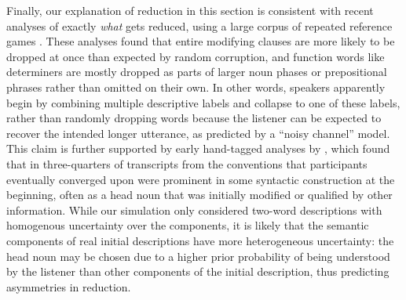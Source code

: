 Finally, our explanation of reduction in this section is consistent with recent analyses of exactly \emph{what} gets reduced, using a large corpus of repeated reference games \cite{hawkins2020characterizing}.
These analyses found that entire modifying clauses are more likely to be dropped at once than expected by random corruption, and function words like determiners are mostly dropped as parts of larger noun phases or prepositional phrases rather than omitted on their own.
In other words, speakers apparently begin by combining multiple descriptive labels and collapse to one of these labels, rather than randomly dropping words because the listener can be expected to recover the intended longer utterance, as predicted by a ``noisy channel'' model.
This claim is further supported by early hand-tagged analyses by , which found that in three-quarters of transcripts from  the conventions that participants eventually converged upon were prominent in some syntactic construction at the beginning, often as a head noun that was initially modified or qualified by other information. 
While our simulation only considered two-word descriptions with homogenous uncertainty over the components, it is likely that the semantic components of real initial descriptions have more heterogeneous uncertainty: the head noun may be chosen due to a higher prior probability of being understood by the listener than other components of the initial description, thus predicting asymmetries in reduction.


